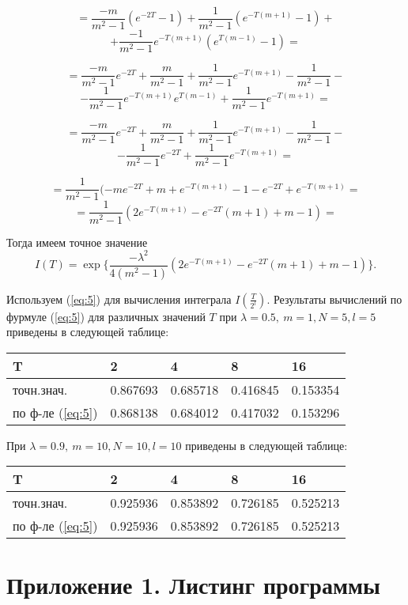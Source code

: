 \documentclass [12pt]{report}
\begin{document}
$$
= \frac{-m}{m^2-1} (e^{-2T} - 1) +
\frac{1}{m^2-1} ( e^{-T(m+1)} - 1) +
$$
$$
+ \frac{-1}{m^2-1} e^{-T(m+1)} (e^{T(m-1)} - 1) =
$$

$$
= \frac{-m}{m^2-1} e^{-2T} + \frac{m}{m^2-1} +
\frac{1}{m^2-1} e^{-T(m+1)} - \frac{1}{m^2-1} -
$$
$$
- \frac{1}{m^2-1} e^{-T(m+1)} e^{T(m-1)} + \frac{1}{m^2-1} e^{-T(m+1)} =
$$

$$
= \frac{-m}{m^2-1} e^{-2T} + \frac{m}{m^2-1} +
\frac{1}{m^2-1} e^{-T(m+1)} - \frac{1}{m^2-1} -
$$
$$
- \frac{1}{m^2-1} e^{-2T} + \frac{1}{m^2-1} e^{-T(m+1)} =
$$

$$
= \frac{1}{m^2-1}( -m e^{-2T} + m +
e^{-T(m+1)} - 1 - e^{-2T} + e^{-T(m+1)} =
$$
$$
= \frac{1}{m^2-1}( 2e^{-T(m+1)} - e^{-2T} (m + 1) + m - 1) =
$$

\noindent Тогда имеем точное значение
$$
I(T) = \exp\{ \frac{- \lambda^2}{4(m^2-1)}
( 2e^{-T(m+1)} - e^{-2T} (m + 1) + m - 1) \}.
$$

\vspace{1cm}

Используем (\ref{eq:5}) для вычисления интеграла $I(\frac{T}{2^l})$.
Результаты вычислений по фурмуле (\ref{eq:5}) для
различных значений $T$ при $\lambda=0.5,~m=1, N=5, l=5$
приведены в следующей таблице:
\begin{center}
\begin{tabular}{ | m{3cm} | m{2cm}| m{2cm} | m{2cm} | m{2cm} | }
\hline
 T & 2 & 4 & 8 & 16 \\
\hline
 точн.знач. & 0.867693 & 0.685718 & 0.416845 & 0.153354 \\
 по ф-ле (\ref{eq:5}) & 0.868138 & 0.684012 & 0.417032 & 0.153296 \\
\hline
\end{tabular}
\end{center}

\noindent При $\lambda=0.9,~m=10, N=10, l=10$
приведены в следующей таблице:
\begin{center}
\begin{tabular}{ | m{3cm} | m{2cm}| m{2cm} | m{2cm} | m{2cm} | }
\hline
 T & 2 & 4 & 8 & 16 \\
\hline
 точн.знач. & 0.925936 & 0.853892 & 0.726185 & 0.525213 \\
 по ф-ле (\ref{eq:5}) & 0.925936 & 0.853892 & 0.726185 & 0.525213 \\
\hline
\end{tabular}
\end{center}

\chapter*{Приложение 1. Листинг программы}
\end{document}
